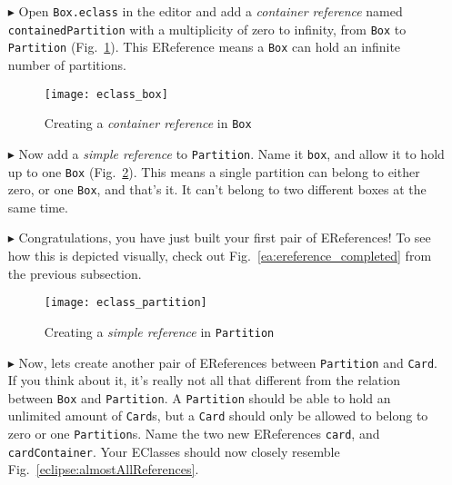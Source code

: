 \begin{itemize}

\item[$\blacktriangleright$] Open \texttt{Box.eclass} in the editor and add a \emph{container reference} named \texttt{containedPartition} with a
multiplicity of zero to infinity, from \texttt{Box} to \texttt{Partition} (Fig.~\ref{eclipse:cpartitionReference}). This EReference means a \texttt{Box}
can hold an infinite number of partitions.

\vspace{0.5cm}

\begin{figure}[htbp]
	\centering
  \texttt{[image: eclass\_box]}
	\caption{Creating a \emph{container reference} in \texttt{Box}}
	\label{eclipse:cpartitionReference}
\end{figure} 

\vspace{0.5cm}

\item[$\blacktriangleright$] Now add a \emph{simple reference} to \texttt{Partition}. Name it \texttt{box}, and allow it to hold up to one \texttt{Box}
(Fig.~\ref{fig:boxReference}). This means a single partition can belong to either zero, or one \texttt{Box}, and that's it. It can't belong to two different
boxes at the same time.

\item[$\blacktriangleright$] Congratulations, you have just built your first pair of EReferences! To see how this is depicted visually, check out
Fig.~\ref{ea:ereference_completed} from the previous subsection.

\newpage

\vspace{0.5cm}

\begin{figure}[htbp]
	\centering
  \texttt{[image: eclass\_partition]}
	\caption{Creating a \emph{simple reference} in \texttt{Partition}}
	\label{fig:boxReference}
\end{figure} 

\vspace{0.5cm}

\item[$\blacktriangleright$] Now, lets create another pair of EReferences between \texttt{Partition} and \texttt{Card}. If you think about it, it's really not
all that different from the relation between \texttt{Box} and \texttt{Partition}. A \texttt{Partition} should be able to hold an unlimited amount of
\texttt{Card}s, but a \texttt{Card} should only be allowed to belong to zero or one \texttt{Partition}s. Name the two new EReferences
\texttt{card}, and \texttt{cardContainer}. Your EClasses should now closely resemble Fig.~\ref{eclipse:almostAllReferences}.


\end{itemize}

